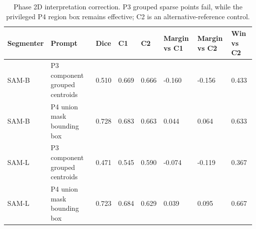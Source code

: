 \begin{table}[t]
\centering
\small
\caption{Phase 2D interpretation correction. P3 grouped sparse points fail, while the privileged P4 region box remains effective; C2 is an alternative-reference control.}
\label{tab:phase2d_interpretation}
\begin{tabular}{llllllll}
\hline
Segmenter & Prompt & Dice & C1 & C2 & Margin vs C1 & Margin vs C2 & Win vs C2 \\
\hline
SAM-B & P3 component grouped centroids & 0.510 & 0.669 & 0.666 & -0.160 & -0.156 & 0.433 \\
SAM-B & P4 union mask bounding box & 0.728 & 0.683 & 0.663 & 0.044 & 0.064 & 0.633 \\
SAM-L & P3 component grouped centroids & 0.471 & 0.545 & 0.590 & -0.074 & -0.119 & 0.367 \\
SAM-L & P4 union mask bounding box & 0.723 & 0.684 & 0.629 & 0.039 & 0.095 & 0.667 \\
\hline
\end{tabular}
\end{table}

